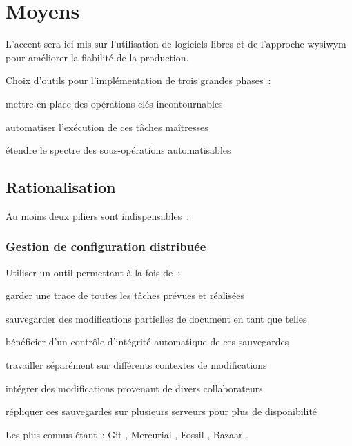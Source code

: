 \section{Moyens}

L’accent sera ici mis sur l’utilisation de logiciels libres
et de l’approche \gls{wysiwym} pour améliorer la fiabilité de la production.

Choix d’outils pour l’implémentation de trois grandes phases :

\begin{itmz}
\item{mettre en place des opérations clés incontournables}
\item{automatiser l’exécution de ces tâches maîtresses}
\item{étendre le spectre des sous-opérations automatisables}
\end{itmz}

\hr

\subsection{Rationalisation}

Au moins deux piliers sont indispensables :

\subsubsection{Gestion de configuration distribuée}

Utiliser un outil permettant à la fois de :
\begin{itmz}
\item{garder une trace de toutes les tâches prévues et réalisées}
\item{sauvegarder des modifications partielles de document en tant que telles}
\item{bénéficier d’un contrôle d’intégrité automatique de ces sauvegardes}
\item{travailler séparément sur différents contextes de modifications}
\item{intégrer des modifications provenant de divers collaborateurs}
\item{répliquer ces sauvegardes sur plusieurs serveurs pour plus de disponibilité}
\end{itmz}
Les plus connus étant :
Git \cite{git}, Mercurial \cite{hg}, Fossil \cite{fossil}, Bazaar \cite{bazaar}.

